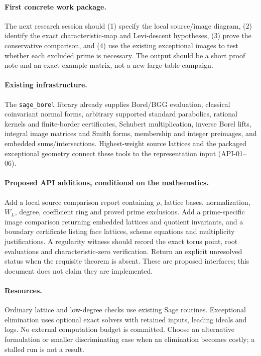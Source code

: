 \documentclass[11pt,letterpaper]{article}
\begin{document}
\paragraph{First concrete work package.}
The next research session should (1) specify the local source/image diagram,
(2) identify the exact characteristic-map and Levi-descent hypotheses,
(3) prove the conservative comparison, and (4) use the existing exceptional
images to test whether each excluded prime is necessary.
The output should be a short proof note and an exact example matrix, not
a new large table campaign.

\paragraph{Existing infrastructure.}
The \texttt{sage\_borel} library already supplies Borel/BGG evaluation,
classical coinvariant normal forms, arbitrary supported standard parabolics,
rational kernels and finite-border certificates, Schubert multiplication,
inverse Borel lifts, integral image matrices and Smith forms, membership
and integer preimages, and embedded sums/intersections. Highest-weight
source lattices and the packaged exceptional geometry connect these tools
to the representation input (API-01--06).

\paragraph{Proposed API additions, conditional on the mathematics.}
Add a local source comparison report containing \(\rho\), lattice bases,
normalization, \(W_L\), degree, coefficient ring and proved prime exclusions.
Add a prime-specific image comparison returning embedded lattices and quotient
invariants, and a boundary certificate listing face lattices, scheme equations
and multiplicity justifications. A regularity witness should record the
exact torus point, root evaluations and characteristic-zero verification.
Return an explicit unresolved status when the requisite theorem is absent.
These are proposed interfaces; this document does not claim they are implemented.

\paragraph{Resources.}
Ordinary lattice and low-degree checks use existing Sage routines.
Exceptional elimination uses optional exact solvers with retained inputs,
leading ideals and logs. No external computation budget is committed.
Choose an alternative formulation or smaller discriminating case when an
elimination becomes costly; a stalled run is not a result.
\end{document}
